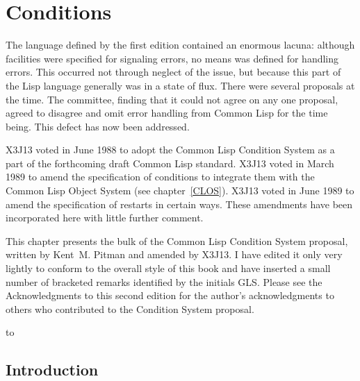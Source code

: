 
\clearpage\def\pagestatus{FINAL PROOF}


\def\SU#1{\({}_{#1}\)}

\chapter{Conditions}
\label{CONDITION}

\prefaceword
\begin{new}
The language defined by the first edition contained an enormous lacuna:
although facilities were specified for signaling errors,
no means was defined for handling errors.  This occurred not through neglect
of the issue, but because this part of the Lisp language generally
was in a state of flux.  There were several proposals at the
time.  The committee, finding that it could not agree on any one proposal,
agreed to disagree and omit error handling from Common Lisp for the time being.
This defect has now been addressed.
\end{new}

X3J13 voted in June 1988
to adopt the Common Lisp Condition System
as a part of the forthcoming draft Common Lisp standard.
X3J13 voted in March 1989 
to amend the specification of conditions to integrate them
with the Common Lisp Object System (see chapter~\ref{CLOS}). 
X3J13 voted in June 1989  to amend the
specification of restarts in certain ways. These amendments have
been incorporated here with little further comment.

This chapter presents the bulk of the Common Lisp
Condition System proposal, written by Kent~M. Pitman
and amended by X3J13.  I have edited it only very lightly
to conform to the overall style of this book and have inserted a small
number of bracketed remarks identified by the initials GLS.
Please see the Acknowledgments to this second edition for the author's
acknowledgments to others who contributed to the Condition System proposal.

\noindent\hbox to \textwidth{\hss---Guy L. Steele Jr.}



\section{Introduction}


